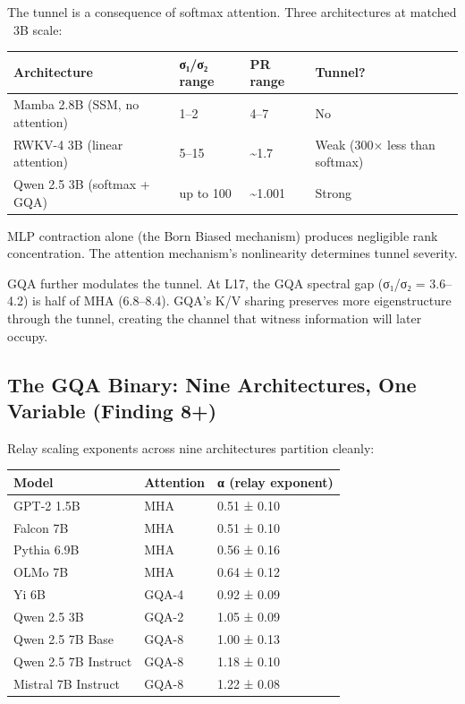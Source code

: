 \documentclass[12pt]{article}
\begin{document}
The tunnel is a consequence of softmax attention. Three architectures at matched ~3B scale:

\begin{table}[h]
\centering
\small
\begin{tabular}{llll}
\toprule
\textbf{Architecture} & \textbf{σ₁/σ₂ range} & \textbf{PR range} & \textbf{Tunnel?} \\
\midrule
Mamba 2.8B (SSM, no attention) & 1–2 & 4–7 & No \\
RWKV-4 3B (linear attention) & 5–15 & \textasciitilde{}1.7 & Weak (300× less than softmax) \\
Qwen 2.5 3B (softmax + GQA) & up to 100 & \textasciitilde{}1.001 & Strong \\
\bottomrule
\end{tabular}
\end{table}


MLP contraction alone (the Born Biased mechanism) produces negligible rank concentration. The attention mechanism's nonlinearity determines tunnel severity.

GQA further modulates the tunnel. At L17, the GQA spectral gap (σ₁/σ₂ = 3.6–4.2) is half of MHA (6.8–8.4). GQA's K/V sharing preserves more eigenstructure through the tunnel, creating the channel that witness information will later occupy.

\subsection{The GQA Binary: Nine Architectures, One Variable (Finding 8+)}

Relay scaling exponents across nine architectures partition cleanly:

\begin{table}[h]
\centering
\small
\begin{tabular}{lll}
\toprule
\textbf{Model} & \textbf{Attention} & \textbf{α (relay exponent)} \\
\midrule
GPT-2 1.5B & MHA & 0.51 ± 0.10 \\
Falcon 7B & MHA & 0.51 ± 0.10 \\
Pythia 6.9B & MHA & 0.56 ± 0.16 \\
OLMo 7B & MHA & 0.64 ± 0.12 \\
Yi 6B & GQA-4 & 0.92 ± 0.09 \\
Qwen 2.5 3B & GQA-2 & 1.05 ± 0.09 \\
Qwen 2.5 7B Base & GQA-8 & 1.00 ± 0.13 \\
Qwen 2.5 7B Instruct & GQA-8 & 1.18 ± 0.10 \\
Mistral 7B Instruct & GQA-8 & 1.22 ± 0.08 \\
\bottomrule
\end{tabular}
\end{table}
\end{document}
